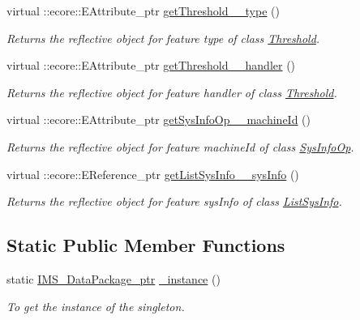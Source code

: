 \begin{DoxyCompactItemize}
virtual ::ecore::EAttribute\_\-ptr \hyperlink{classIMS__Data_1_1IMS__DataPackage_aae9f5138df08b6f479cafb7e1b83b37d}{getThreshold\_\-\_\-type} ()
\begin{DoxyCompactList}\small\item\em Returns the reflective object for feature type of class \hyperlink{classIMS__Data_1_1Threshold}{Threshold}. \item\end{DoxyCompactList}\item 
virtual ::ecore::EAttribute\_\-ptr \hyperlink{classIMS__Data_1_1IMS__DataPackage_a7acbb0b6484cf8b01a9d2a3637482b91}{getThreshold\_\-\_\-handler} ()
\begin{DoxyCompactList}\small\item\em Returns the reflective object for feature handler of class \hyperlink{classIMS__Data_1_1Threshold}{Threshold}. \item\end{DoxyCompactList}\item 
virtual ::ecore::EAttribute\_\-ptr \hyperlink{classIMS__Data_1_1IMS__DataPackage_a12ea71bcff0da0777fbfdc0aa9e914c4}{getSysInfoOp\_\-\_\-machineId} ()
\begin{DoxyCompactList}\small\item\em Returns the reflective object for feature machineId of class \hyperlink{classIMS__Data_1_1SysInfoOp}{SysInfoOp}. \item\end{DoxyCompactList}\item 
virtual ::ecore::EReference\_\-ptr \hyperlink{classIMS__Data_1_1IMS__DataPackage_aadf48adbff912b5beb0581b975424244}{getListSysInfo\_\-\_\-sysInfo} ()
\begin{DoxyCompactList}\small\item\em Returns the reflective object for feature sysInfo of class \hyperlink{classIMS__Data_1_1ListSysInfo}{ListSysInfo}. \item\end{DoxyCompactList}\end{DoxyCompactItemize}
\subsection*{Static Public Member Functions}
\begin{DoxyCompactItemize}
\item 
static \hyperlink{classIMS__Data_1_1IMS__DataPackage}{IMS\_\-DataPackage\_\-ptr} \hyperlink{classIMS__Data_1_1IMS__DataPackage_a5455de9bdd76489ebb3b45e2d2597069}{\_\-instance} ()
\begin{DoxyCompactList}\small\item\em To get the instance of the singleton. \item\end{DoxyCompactList}\end{DoxyCompactItemize}

